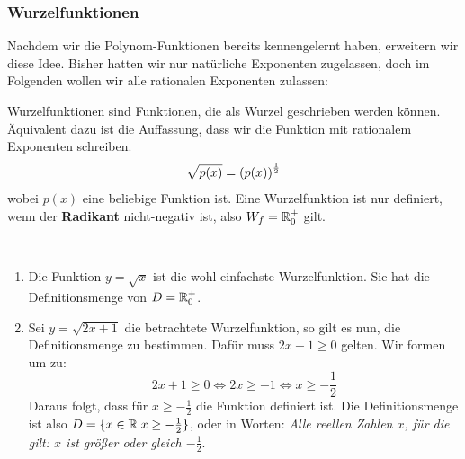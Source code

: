 \documentclass[ngerman, 12pt]{nssheetxea}
\begin{document}
\subsubsection{Wurzelfunktionen}
Nachdem wir die Polynom-Funktionen bereits kennengelernt haben, erweitern wir diese Idee. Bisher hatten wir nur natürliche Exponenten zugelassen, doch im Folgenden wollen wir alle rationalen Exponenten zulassen:

\begin{definition}

Wurzelfunktionen sind Funktionen, die als Wurzel geschrieben werden können. Äquivalent dazu ist die Auffassung, dass wir die Funktion mit rationalem Exponenten schreiben.
\[ \sqrt{p(x)} = \mleft( p(x) \mright)^{\frac{1}{2}}  \]
wobei $p(x)$ eine beliebige Funktion ist. Eine Wurzelfunktion ist nur definiert, wenn der \textbf{Radikant} nicht-negativ ist, also $W_f=\mathbb{R}^+_0$ gilt. 
  
\end{definition}

\begin{example}
\ 
\begin{enumerate}
\item Die Funktion $y=\sqrt{x}$ ist die wohl einfachste Wurzelfunktion. Sie hat die Definitionsmenge von $D=\mathbb{R}_0^+$.

\begin{center}
\end{center}

\item Sei $y=\sqrt{2x+1}$ die betrachtete Wurzelfunktion, so gilt es nun, die Definitionsmenge zu bestimmen. Dafür muss $2x+1\geq 0$ gelten. Wir formen um zu:
\[ 2x+1\geq 0 \Leftrightarrow 2x \geq -1 \Leftrightarrow x \geq - \frac{1}{2}  \]
Daraus folgt, dass für $x\geq - \frac{1}{2}$ die Funktion definiert ist. Die Definitionsmenge ist also $D=\{ x \in \mathbb{R} | x \geq - \frac{1}{2}   \}$, oder in Worten: \textit{Alle reellen Zahlen $x$, für die gilt: $x$ ist größer oder gleich $-\frac{1}{2}$}.

\begin{center}
\end{center}
\end{enumerate}

\end{example}
\end{document}

